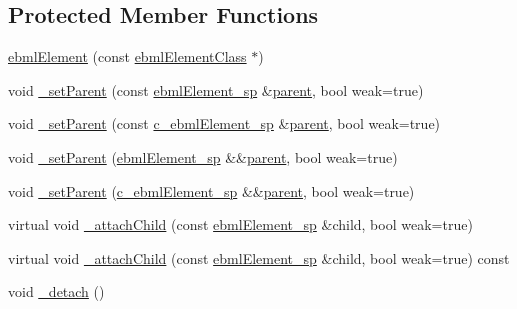 \subsection*{Protected Member Functions}
\begin{DoxyCompactItemize}
\item 
\mbox{\hyperlink{classebml_1_1ebmlElement_ab7e661b76def75bcfb8cd55224ae2ce5}{ebml\+Element}} (const \mbox{\hyperlink{classebml_1_1ebmlElementClass}{ebml\+Element\+Class}} $\ast$)
\item 
void \mbox{\hyperlink{classebml_1_1ebmlElement_adb339374049c8687265a32a38be45254}{\+\_\+set\+Parent}} (const \mbox{\hyperlink{namespaceebml_adad533b7705a16bb360fe56380c5e7be}{ebml\+Element\+\_\+sp}} \&\mbox{\hyperlink{classebml_1_1ebmlElement_a7b47b4c43f09c62f56ba326b906fe718}{parent}}, bool weak=true)
\item 
void \mbox{\hyperlink{classebml_1_1ebmlElement_a0bf0180b2d3db0849adb14948a1fb6cb}{\+\_\+set\+Parent}} (const \mbox{\hyperlink{namespaceebml_a2deef4e8071531b32e3533f1bf978917}{c\+\_\+ebml\+Element\+\_\+sp}} \&\mbox{\hyperlink{classebml_1_1ebmlElement_a7b47b4c43f09c62f56ba326b906fe718}{parent}}, bool weak=true)
\item 
void \mbox{\hyperlink{classebml_1_1ebmlElement_a6bf9f234191ecfe00b7f4977cf2bc8ec}{\+\_\+set\+Parent}} (\mbox{\hyperlink{namespaceebml_adad533b7705a16bb360fe56380c5e7be}{ebml\+Element\+\_\+sp}} \&\&\mbox{\hyperlink{classebml_1_1ebmlElement_a7b47b4c43f09c62f56ba326b906fe718}{parent}}, bool weak=true)
\item 
void \mbox{\hyperlink{classebml_1_1ebmlElement_a96ce6cd8233aaad83c510aef19b0d345}{\+\_\+set\+Parent}} (\mbox{\hyperlink{namespaceebml_a2deef4e8071531b32e3533f1bf978917}{c\+\_\+ebml\+Element\+\_\+sp}} \&\&\mbox{\hyperlink{classebml_1_1ebmlElement_a7b47b4c43f09c62f56ba326b906fe718}{parent}}, bool weak=true)
\item 
virtual void \mbox{\hyperlink{classebml_1_1ebmlElement_aadc63457f069b5bcdbd81ee8a9801979}{\+\_\+attach\+Child}} (const \mbox{\hyperlink{namespaceebml_adad533b7705a16bb360fe56380c5e7be}{ebml\+Element\+\_\+sp}} \&child, bool weak=true)
\item 
virtual void \mbox{\hyperlink{classebml_1_1ebmlElement_a588c003e8cfba8455fd6da9f879330d7}{\+\_\+attach\+Child}} (const \mbox{\hyperlink{namespaceebml_adad533b7705a16bb360fe56380c5e7be}{ebml\+Element\+\_\+sp}} \&child, bool weak=true) const
\item 
void \mbox{\hyperlink{classebml_1_1ebmlElement_ac567afa28f18f9327299d47b1ab64550}{\+\_\+detach}} ()

\end{DoxyCompactItemize}
